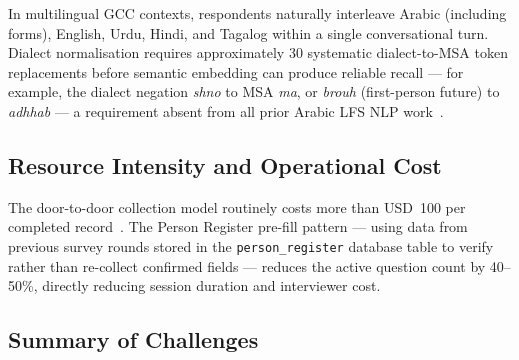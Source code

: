 In multilingual GCC contexts, respondents naturally interleave Arabic (including
forms), English, Urdu, Hindi, and Tagalog within a single conversational turn.
Dialect normalisation requires approximately 30 systematic
dialect-to-MSA token replacements before semantic embedding can produce
reliable recall --- for example, the dialect negation \textit{shno} to MSA
\textit{ma}, or \textit{brouh} (first-person future) to \textit{adhhab}
--- a requirement absent from all prior Arabic LFS NLP
work~\cite{hamed2025codeswitching}.

\subsection{Resource Intensity and Operational Cost}

The door-to-door collection model routinely costs more than USD~100 per completed record~\cite{zhang2025synthetic}.
The Person Register pre-fill pattern --- using data from previous survey rounds
stored in the \texttt{person\_register} database table to verify rather than
re-collect confirmed fields --- reduces the active question count by 40--50\%,
directly reducing session duration and interviewer cost.

\subsection{Summary of Challenges}

\begin{table}[htbp]
\centering
\caption{Operational challenges in traditional LFS administration and their
documented impacts.}
\label{tab:ch1-challenges}
\small\renewcommand{\arraystretch}{1.35}
\end{table}


